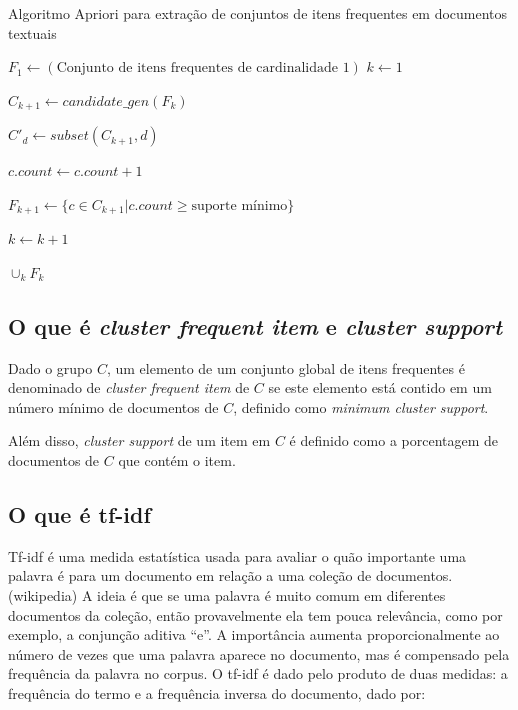 \documentclass[a4paper,12pt]{article}
\begin{document}
\begin{algorithm}
\caption{Algoritmo Apriori para extração de conjuntos de itens frequentes em documentos textuais}
\label{algorithm_apriori}
\begin{algorithmic}[1]
\State $F_{1} \gets (\text{Conjunto de itens frequentes de cardinalidade 1})$
\State $k \gets 1$

	\State $C_{k+1} \gets candidate\_gen(F_{k}) $
	
		\State $C'_{d} \gets subset(C_{k+1},d)$
		
			\State $c.count \gets c.count + 1$
		\EndFor
		
	\EndFor
	
	\State $F_{k+1} \gets \{ c \in C_{k+1} | c.count \geq \text{suporte mínimo} \}$
	
	\State $k \gets k + 1$
\EndWhile

\Return $\cup_{k} F_{k}$
\end{algorithmic}
\end{algorithm}

\subsection {O que é \textit{cluster frequent item} e \textit{cluster support}}
\label {sec:cluster_frequent_item_e_cluster_support}

Dado o grupo $C$, um elemento de um conjunto global de itens frequentes é denominado de \textit{cluster frequent item} de $C$ se este elemento está contido em um número mínimo de documentos de $C$, definido como \textit{minimum cluster support}.

Além disso, \textit{cluster support} de um item em $C$ é definido como a porcentagem de documentos de $C$ que contém o item.

\subsection {O que é tf-idf}
\label {sec:tf_idf}

Tf-idf é uma medida estatística usada para avaliar o quão importante uma palavra é para um documento em relação a uma coleção de documentos. (wikipedia)  A ideia é que se uma palavra é muito comum em diferentes documentos da coleção, então provavelmente ela tem pouca relevância, como por exemplo, a conjunção aditiva “e”. A importância aumenta proporcionalmente ao número de vezes que uma palavra aparece no documento, mas é compensado pela frequência da palavra no corpus. O tf-idf é dado pelo produto de duas medidas: a frequência do termo e a frequência inversa do documento, dado por:
\end{document}

